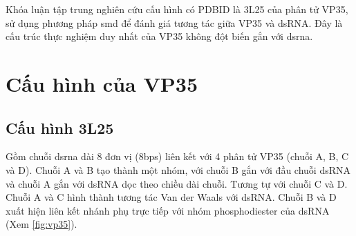 \documentclass[12pt,a4paper,reqno, oneside]{book}
\begin{document}
	Khóa luận tập trung nghiên cứu cấu hình có PDBID là 3L25 của phân tử VP35, sử dụng phương pháp \gls{smd} để đánh giá tương tác giữa VP35 và dsRNA. Đây là cấu trúc thực nghiệm duy nhất của VP35 không đột biến gắn với \gls{dsrna}.
\section{Cấu hình của VP35}
	\subsection{Cấu hình 3L25}
	
		Gồm chuỗi \gls{dsrna} dài 8 đơn vị (8bps) liên kết với 4 phân tử VP35 (chuỗi A, B, C và D). Chuỗi A và B tạo thành một nhóm, với chuỗi B gắn với đầu chuỗi dsRNA và chuỗi A gắn với dsRNA dọc theo chiều dài chuỗi. Tương tự với chuỗi C và D. Chuỗi A và C hình thành tương tác Van der Waals với dsRNA. Chuỗi B và D xuất hiện liên kết nhánh phụ trực tiếp với nhóm phosphodiester của dsRNA\cite{Leung2010} (Xem \ref{fig:vp35}).
\end{document}
